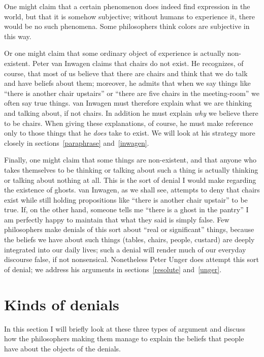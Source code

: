 \documentclass[11pt]{standalone}
\begin{document}
\begin{spacing}{1.5}
One might claim that a certain phenomenon does indeed find expression
in the world, but that it is somehow subjective; without humans to
experience it, there would be no such phenomena.  Some philosophers
think colors are subjective in this way.

Or one might claim that some ordinary object of experience is actually
non-existent.  Peter van Inwagen claims that chairs do not exist.  He
recognizes, of course, that most of us believe that there are chairs
and think that we do talk and have beliefs about them; moreover, he
admits that when we say things like ``there is another chair
upstairs'' or ``there are five chairs in the meeting-room'' we often
say true things.  van Inwagen must therefore explain what we are
thinking and talking about, if not chairs.  In addition he must
explain {\em why} we believe there to be chairs.  When giving these
explanations, of course, he must make reference only to those things
that he \emph{does} take to exist.  We will look at his strategy more
closely in sections~\ref{paraphrase} and~\ref{inwagen}.

Finally, one might claim that some things are non-existent, and that
anyone who takes themselves to be thinking or talking about such a
thing is actually thinking or talking about nothing at all.  This is
the sort of denial I would make regarding the existence of ghosts.
van Inwagen, as we shall see, attempts to deny that chairs exist while
still holding propositions like ``there is another chair upstair'' to
be true.  If, on the other hand, someone tells me ``there is a ghost
in the pantry'' I am perfectly happy to maintain that what they said
is simply false.  Few philosophers make denials of this sort about
``real or significant'' things, because the beliefs we have about such
things (tables, chairs, people, custard) are deeply integrated into
our daily lives; such a denial will render much of our everyday
discourse false, if not nonsensical.  Nonetheless Peter Unger does
attempt this sort of denial; we address his arguments in
sections~\ref{resolute} and~\ref{unger}.

\section{Kinds of denials}
In this section I will briefly look at these three types of argument
and discuss how the philosophers making them manage to explain the
beliefs that people have about the objects of the denials.


\end{spacing}
\end{document}
